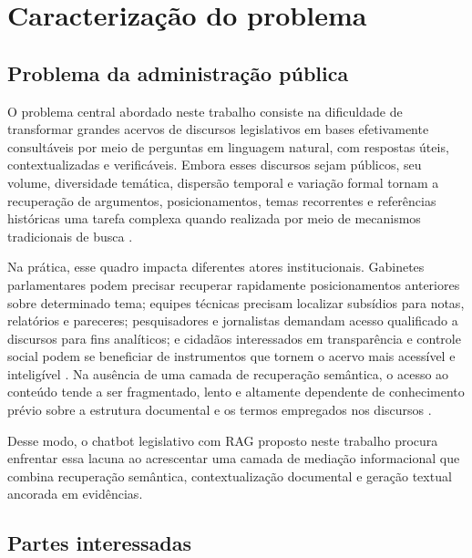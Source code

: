 \section{Caracterização do problema}

\subsection{Problema da administração pública}

O problema central abordado neste trabalho consiste na dificuldade de transformar grandes acervos de discursos legislativos em bases efetivamente consultáveis por meio de perguntas em linguagem natural, com respostas úteis, contextualizadas e verificáveis. Embora esses discursos sejam públicos, seu volume, diversidade temática, dispersão temporal e variação formal tornam a recuperação de argumentos, posicionamentos, temas recorrentes e referências históricas uma tarefa complexa quando realizada por meio de mecanismos tradicionais de busca \parencite{kavcic2024historicalViewer,blanco2025plenarioPalanqueEstudio,blanco2026letrasGraudas}.

Na prática, esse quadro impacta diferentes atores institucionais. Gabinetes parlamentares podem precisar recuperar rapidamente posicionamentos anteriores sobre determinado tema; equipes técnicas precisam localizar subsídios para notas, relatórios e pareceres; pesquisadores e jornalistas demandam acesso qualificado a discursos para fins analíticos; e cidadãos interessados em transparência e controle social podem se beneficiar de instrumentos que tornem o acervo mais acessível e inteligível \parencite{bandeiraBernardes2016information}. Na ausência de uma camada de recuperação semântica, o acesso ao conteúdo tende a ser fragmentado, lento e altamente dependente de conhecimento prévio sobre a estrutura documental e os termos empregados nos discursos \parencite{gao2023ragSurvey,martelloteViola2025organizacaoConhecimento,geunis2023parliamentaryMonitoring}.

Desse modo, o chatbot legislativo com RAG proposto neste trabalho procura enfrentar essa lacuna ao acrescentar uma camada de mediação informacional que combina recuperação semântica, contextualização documental e geração textual ancorada em evidências.

\subsection{Partes interessadas}


